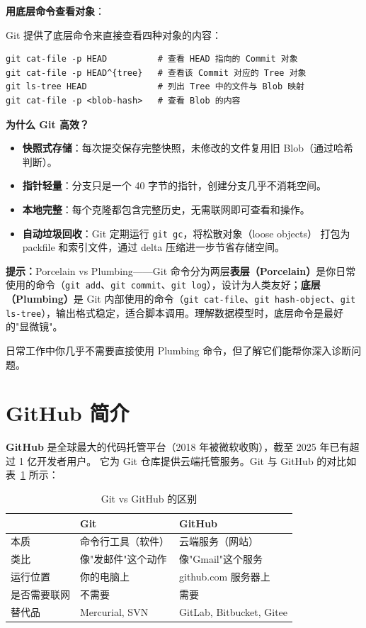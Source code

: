 \documentclass[12pt,a4paper,openany]{ctexbook}
\begin{document}
\medskip
\textbf{用底层命令查看对象}：

Git 提供了底层命令来直接查看四种对象的内容：
\begin{lstlisting}[style=shell]
git cat-file -p HEAD          # 查看 HEAD 指向的 Commit 对象
git cat-file -p HEAD^{tree}   # 查看该 Commit 对应的 Tree 对象
git ls-tree HEAD              # 列出 Tree 中的文件与 Blob 映射
git cat-file -p <blob-hash>   # 查看 Blob 的内容
\end{lstlisting}
\medskip

\medskip
\textbf{为什么 Git 高效？}
\begin{itemize}
  \item \textbf{快照式存储}：每次提交保存完整快照，未修改的文件复用旧 Blob（通过哈希判断）。
  \item \textbf{指针轻量}：分支只是一个 40 字节的指针，创建分支几乎不消耗空间。
  \item \textbf{本地完整}：每个克隆都包含完整历史，无需联网即可查看和操作。
  \item \textbf{自动垃圾回收}：Git 定期运行 \texttt{git gc}，将松散对象（loose objects）
        打包为 packfile 和索引文件，通过 delta 压缩进一步节省存储空间。
\end{itemize}
\medskip

\medskip
\noindent\textbf{提示：}Porcelain vs Plumbing——Git 命令分为两层\textbf{表层（Porcelain）}是你日常使用的命令（\texttt{git add}、\texttt{git commit}、\texttt{git log}），设计为人类友好；\textbf{底层（Plumbing）}是 Git 内部使用的命令（\texttt{git cat-file}、\texttt{git hash-object}、\texttt{git ls-tree}），输出格式稳定，适合脚本调用。理解数据模型时，底层命令是最好的"显微镜"。

日常工作中你几乎不需要直接使用 Plumbing 命令，但了解它们能帮你深入诊断问题。
\medskip

\section{GitHub 简介}

\textbf{GitHub} 是全球最大的代码托管平台（2018 年被微软收购），截至 2025 年已有超过 1 亿开发者用户。
它为 Git 仓库提供云端托管服务。Git 与 GitHub 的对比如表~\ref{tab:git-vs-github} 所示：

\begin{table}[H]\centering
\caption{Git vs GitHub 的区别}\label{tab:git-vs-github}

{\renewcommand{\arraystretch}{1.3}\setlength{\tabcolsep}{6pt}\begin{tabularx}{\textwidth}{l >{\raggedright\arraybackslash}X >{\raggedright\arraybackslash}X}
\toprule
& \textbf{Git} & \textbf{GitHub} \\
\midrule
本质 & 命令行工具（软件） & 云端服务（网站） \\
类比 & 像"发邮件"这个动作 & 像"Gmail"这个服务 \\
运行位置 & 你的电脑上 & github.com 服务器上 \\
是否需要联网 & 不需要 & 需要 \\
替代品 & Mercurial, SVN & GitLab, Bitbucket, Gitee \\
\bottomrule
\end{tabularx}}
\end{table}
\end{document}
